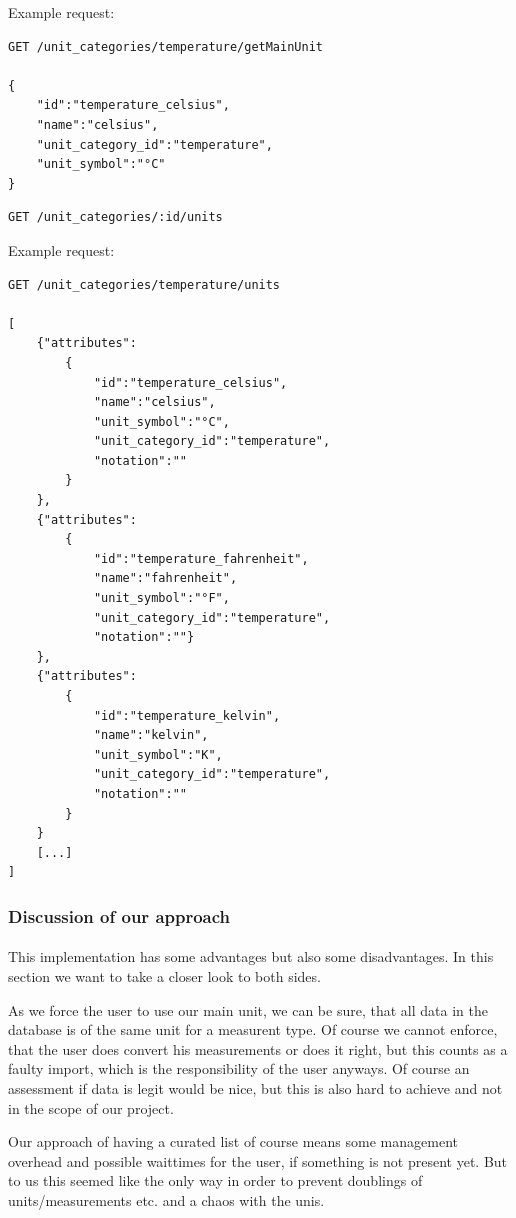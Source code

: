 Example request:

\begin{verbatim}
GET /unit_categories/temperature/getMainUnit

{
	"id":"temperature_celsius",
	"name":"celsius",
	"unit_category_id":"temperature",
	"unit_symbol":"°C"
}
\end{verbatim}

\begin{verbatim}
GET /unit_categories/:id/units
\end{verbatim}

Example request:

\begin{verbatim}
GET /unit_categories/temperature/units

[
	{"attributes":
		{
			"id":"temperature_celsius",
			"name":"celsius",
			"unit_symbol":"°C",
			"unit_category_id":"temperature",
			"notation":""
		}
	},
	{"attributes":
		{
			"id":"temperature_fahrenheit",
			"name":"fahrenheit",
			"unit_symbol":"°F",
			"unit_category_id":"temperature",
			"notation":""}
	},
	{"attributes":
		{
			"id":"temperature_kelvin",
			"name":"kelvin",
			"unit_symbol":"K",
			"unit_category_id":"temperature",
			"notation":""
		}
	}
	[...]
]
\end{verbatim}

\subsubsection{Discussion of our approach}\label{discussion-of-our-approach}

\paragraph{}

This implementation has some advantages but also some disadvantages. In
this section we want to take a closer look to both sides.

As we force the user to use our main unit, we can be sure, that all data
in the database is of the same unit for a measurent type. Of course we
cannot enforce, that the user does convert his measurements or does it
right, but this counts as a faulty import, which is the responsibility
of the user anyways. Of course an assessment if data is legit would be
nice, but this is also hard to achieve and not in the scope of our
project.

Our approach of having a curated list of course means some management
overhead and possible waittimes for the user, if something is not
present yet. But to us this seemed like the only way in order to prevent
doublings of units/measurements etc. and a chaos with the unis.

